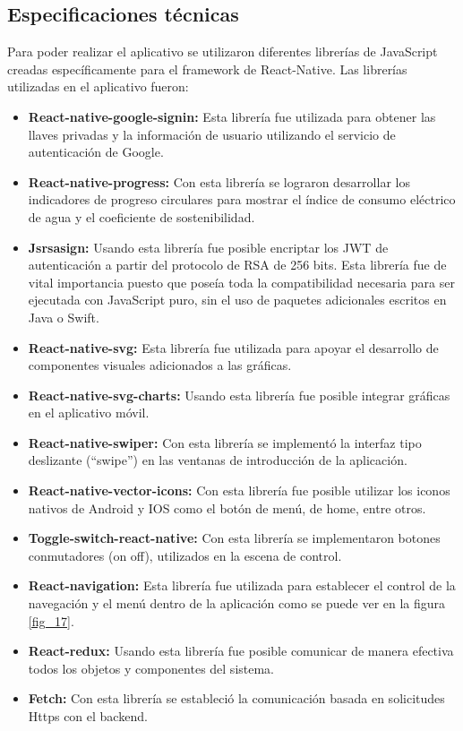 \subsection{Especificaciones técnicas}

Para poder realizar el aplicativo se utilizaron diferentes librerías de JavaScript creadas específicamente para el framework de React-Native. Las librerías utilizadas en el aplicativo fueron:

\begin{itemize}
	\item \textbf{React-native-google-signin:} Esta librería fue utilizada para obtener las llaves privadas y la información de usuario utilizando el servicio de autenticación de Google.
	\item \textbf{React-native-progress:} Con esta librería se lograron desarrollar los indicadores de progreso circulares para mostrar el índice de consumo eléctrico de agua y el coeficiente de sostenibilidad.
	\item \textbf{Jsrsasign:} Usando esta librería fue posible encriptar los JWT de autenticación a partir del protocolo de RSA de 256 bits. Esta librería fue de vital importancia puesto que poseía toda la compatibilidad necesaria para ser ejecutada con JavaScript puro, sin el uso de paquetes adicionales escritos en Java o Swift.
	\item \textbf{React-native-svg:} Esta librería fue utilizada para apoyar el desarrollo de componentes visuales adicionados a las gráficas.
	\item \textbf{React-native-svg-charts:} Usando esta librería fue posible integrar gráficas en el aplicativo móvil.
	\item \textbf{React-native-swiper:} Con esta librería se implementó la interfaz tipo deslizante (``swipe'') en las ventanas de introducción de la aplicación.
	\item \textbf{React-native-vector-icons:} Con esta librería fue posible utilizar los iconos nativos de Android y IOS como el botón de menú, de home, entre otros.
	\item \textbf{Toggle-switch-react-native:} Con esta librería se implementaron botones conmutadores (on off), utilizados en la escena de control.
	\item \textbf{React-navigation:} Esta librería fue utilizada para establecer el control de la navegación y el menú dentro de la aplicación como se puede ver en la figura \ref{fig_17}.
	\item \textbf{React-redux:} Usando esta librería fue posible comunicar de manera efectiva todos los objetos y componentes del sistema.
	\item \textbf{Fetch:} Con esta librería se estableció la comunicación basada en solicitudes Https con el backend.
\end{itemize}
